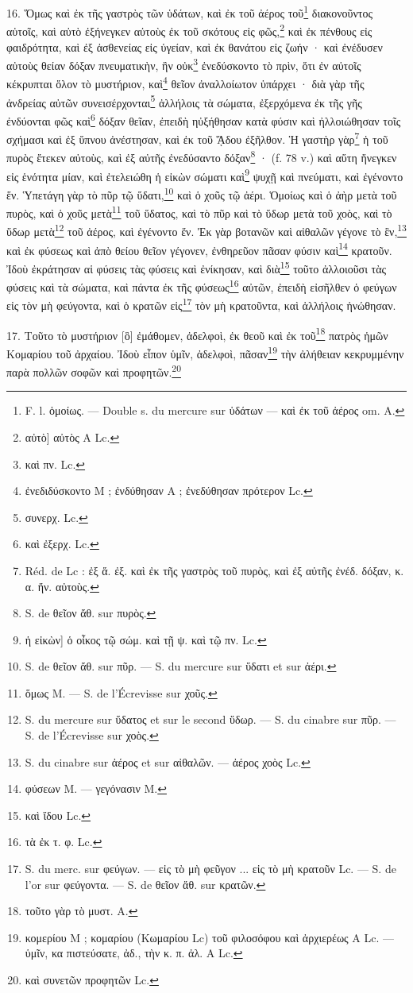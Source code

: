 \documentclass[a4paper, 11pt, oneside, polutonikogreek, french]{article}
\begin{document}
16. Ὅμως καὶ ἐκ τῆς γαστρὸς τῶν ὑδάτων, καὶ ἐκ τοῦ ἀέρος τοῦ\footnote{F. l. ὁμοίως. --- Double s. du mercure sur ὑδάτων --- καὶ ἐκ τοῦ ἀέρος om. A.} διακονοῦντος αὐτοῖς, καὶ αὐτὸ ἐξήνεγκεν αὐτοὺς ἐκ τοῦ σκότους εἰς φῶς,\footnote{αὐτὸ] αὐτὸς A Lc.} καὶ ἐκ πένθους εἰς φαιδρότητα, καὶ ἐξ ἀσθενείας εἰς ὑγείαν, καὶ ἐκ θανάτου εἰς ζωήν · καὶ ἐνέδυσεν αὐτοὺς θείαν δόξαν πνευματικὴν, ἣν οὐκ\footnote{καὶ πν. Lc.} ἐνεδύσκοντο τὸ πρὶν, ὅτι ἐν αὐτοῖς κέκρυπται ὅλον τὸ μυστήριον, καὶ\footnote{ἐνεδιδύσκοντο M ; ἐνδύθησαν A ; ἐνεδύθησαν πρότερον Lc.} θεῖον ἀναλλοίωτον ὑπάρχει · διὰ γὰρ τῆς ἀνδρείας αὐτῶν συνεισέρχονται\footnote{συνερχ. Lc.} ἀλλήλοις τὰ σώματα, ἐξερχόμενα ἐκ τῆς γῆς ἐνδύονται φῶς καὶ\footnote{καὶ ἐξερχ. Lc.} δόξαν θεῖαν, ἐπειδὴ ηὐξήθησαν κατὰ φύσιν καὶ ἠλλοιώθησαν τοῖς σχήμασι καὶ ἐξ ὕπνου ἀνέστησαν, καὶ ἐκ τοῦ ᾍδου ἐξῆλθον. Ἡ γαστὴρ γὰρ\footnote{Réd. de Lc : ἐξ ἅ. ἐξ. καὶ ἐκ τῆς γαστρὸς τοῦ πυρὸς, καὶ ἐξ αὐτῆς  ἐνέδ. δόξαν, κ. α. ἤν. αὐτοὺς.} ἡ τοῦ πυρὸς ἔτεκεν αὐτοὺς, καὶ ἐξ αὐτῆς ἐνεδύσαντο δόξαν\footnote{S. de θεῖον ἄθ. sur πυρὸς.} · (f. 78 v.) καὶ αὕτη ἤνεγκεν εἰς ἑνότητα μίαν, καὶ ἐτελειώθη ἡ εἰκὼν σώματι καὶ\footnote{ἡ εἰκὼν] ὁ οἶκος τῷ σώμ. καὶ τῇ ψ. καὶ τῷ πν. Lc.} ψυχῇ καὶ πνεύματι, καὶ ἐγένοντο ἕν. Ὑπετάγη γὰρ τὸ πῦρ τῷ ὕδατι,\footnote{S. de θεῖον ἄθ. sur πῦρ. --- S. du mercure sur ὕδατι et sur ἀέρι.} καὶ ὁ χοῦς τῷ ἀέρι. Ὁμοίως καὶ ὁ ἀὴρ μετὰ τοῦ πυρὸς, καὶ ὁ χοῦς μετὰ\footnote{ὅμως M. --- S. de l'Écrevisse sur χοῦς.} τοῦ ὕδατος, καὶ τὸ πῦρ καὶ τὸ ὕδωρ μετὰ τοῦ χοὸς, καὶ τὸ ὕδωρ μετὰ\footnote{S. du mercure sur ὕδατος et sur le second ὕδωρ. --- S. du cinabre sur πῦρ. --- S. de l'Écrevisse sur χοὸς.} τοῦ ἀέρος, καὶ ἐγένοντο ἕν. Ἐκ γὰρ βοτανῶν καὶ αἰθαλῶν γέγονε τὸ ἓν,\footnote{S. du cinabre sur ἀέρος et sur αἰθαλῶν. --- ἀέρος χοὸς Lc.} καὶ ἐκ φύσεως καὶ ἀπὸ θείου θεῖον γέγονεν, ἐνθηρεῦον πᾶσαν φύσιν καὶ\footnote{φύσεων M. --- γεγόνασιν M.} κρατοῦν. Ἰδοὺ ἐκράτησαν αἱ φύσεις τὰς φύσεις καὶ ἐνίκησαν, καὶ διὰ\footnote{καὶ ἴδου Lc.} τοῦτο ἀλλοιοῦσι τὰς φύσεις καὶ τὰ σώματα, καὶ πάντα ἐκ τῆς φύσεως\footnote{τὰ ἐκ τ. φ. Lc.} αὐτῶν, ἐπειδὴ εἰσῆλθεν ὁ φεύγων εἰς τὸν μὴ φεύγοντα, καὶ ὁ κρατῶν εἰς\footnote{S. du merc. sur φεύγων. --- εἰς τὸ μὴ φεῦγον ... εἰς τὸ μὴ κρατοῦν Lc. --- S. de l'or sur φεύγοντα. --- S. de θεῖον ἄθ. sur κρατῶν.} τὸν μὴ κρατοῦντα, καὶ ἀλλήλοις ἡνώθησαν.

17. Τοῦτο τὸ μυστήριον [ὃ] ἐμάθομεν, ἀδελφοὶ, ἐκ θεοῦ καὶ ἐκ τοῦ\footnote{τοῦτο γὰρ τὸ μυστ. A.} πατρὸς ἡμῶν Κομαρίου τοῦ ἀρχαίου. Ἰδοὺ εἶπον ὑμῖν, ἀδελφοὶ, πᾶσαν\footnote{κομερίου M ; κομαρίου (Κωμαρίου Lc) τοῦ φιλοσόφου καὶ ἀρχιερέως A Lc. --- ὑμῖν, κα πιστεύσατε, ἀδ., τὴν κ. π. ἀλ. A Lc.} τὴν ἀλήθειαν κεκρυμμένην παρὰ πολλῶν σοφῶν καὶ προφητῶν.\footnote{καὶ συνετῶν προφητῶν Lc.}
\end{document}
